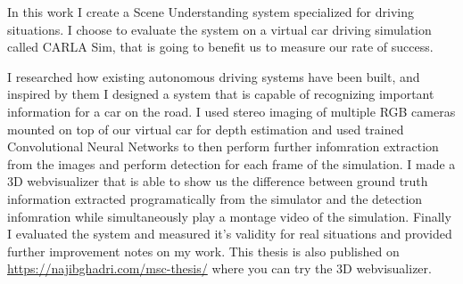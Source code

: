 In this work I create a Scene Understanding system specialized for driving
situations. I choose to evaluate the system on a virtual car driving simulation
called CARLA Sim, that is going to benefit us to measure our rate of success.

I researched how existing autonomous driving systems have been built, and
inspired by them I designed a system that is capable of recognizing important
information for a car on the road. I used stereo imaging of multiple RGB cameras
mounted on top of our virtual car for depth estimation and used trained
Convolutional Neural Networks to then perform further infomration extraction
from the images and perform detection for each frame of the simulation. I made a
3D webvisualizer that is able to show us the difference between ground truth
information extracted programatically from the simulator and the detection
infomration while simultaneously play a montage video of the simulation. Finally
I evaluated the system and measured it's validity for real situations and
provided further improvement notes on my work. This thesis is also published on
\url{https://najibghadri.com/msc-thesis/} where you can try the 3D
webvisualizer.

\vfill
\selectthesislanguage

\setcounter{romanPage}{\value{page}}
